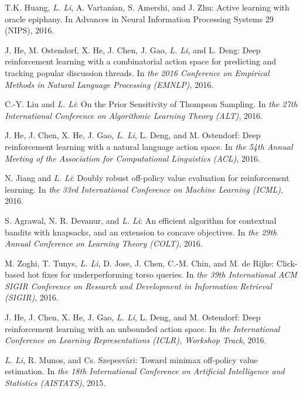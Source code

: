 \documentclass[10pt,twoside,letterpaper]{article}
\newcommand{\selffont}[1]{{\textit{#1}}}
\newcommand{\venuefont}[1]{{\textit{#1}}}
\newcommand{\myself}{\selffont{L. Li}}
\begin{document}
\begin{compactenum}[(C1)]
\item{T.K. Huang, \myself, A. Vartanian, S. Amershi, and J. Zhu: Active learning with oracle epiphany.  In Advances in Neural Information Processing Systems 29 (NIPS), 2016.}

\item{J. He, M. Ostendorf, X. He, J. Chen, J. Gao, \myself, and L. Deng: Deep reinforcement learning with a combinatorial action space for predicting and tracking popular discussion threads.  In \venuefont{the 2016 Conference on Empirical Methods in Natural Language Processing (EMNLP)}, 2016.}

\item{C.-Y. Liu and \myself: On the Prior Sensitivity of Thompson Sampling. In \venuefont{the 27th International Conference on Algorithmic Learning Theory (ALT)}, 2016.}

\item{J. He, J. Chen, X. He, J. Gao, \myself, L. Deng, and M. Ostendorf: Deep reinforcement learning with a natural language action space.  In \venuefont{the 54th Annual Meeting of the Association for Computational Linguistics (ACL)}, 2016.}

\item{N. Jiang and \myself: Doubly robust off-policy value evaluation for reinforcement learning.  In \venuefont{the 33rd International Conference on Machine Learning (ICML)}, 2016.}

\item{S. Agrawal, N. R. Devanur, and \myself: An efficient algorithm for contextual bandits with knapsacks, and an extension to concave objectives.  In \venuefont{the 29th Annual Conference on Learning Theory (COLT)}, 2016.}

\item{M. Zoghi, T. Tunys, \myself, D. Jose, J. Chen, C.-M. Chin, and M. de Rijke: Click-based hot fixes for underperforming torso queries.  In \venuefont{the 39th International ACM SIGIR Conference on Research and Development in Information Retrieval (SIGIR)}, 2016.}

\item{J. He, J. Chen, X. He, J. Gao, \myself, L. Deng, and M. Ostendorf: Deep reinforcement learning with an unbounded action space.  In \venuefont{the International Conference on Learning Representations (ICLR), Workshop Track}, 2016.}

\item{\myself, R. Munos, and Cs. Szepesv\'{a}ri: Toward minimax off-policy value estimation.  In \venuefont{the 18th International Conference on Artificial Intelligence and Statistics (AISTATS)}, 2015.}


\end{compactenum}
\end{document}
